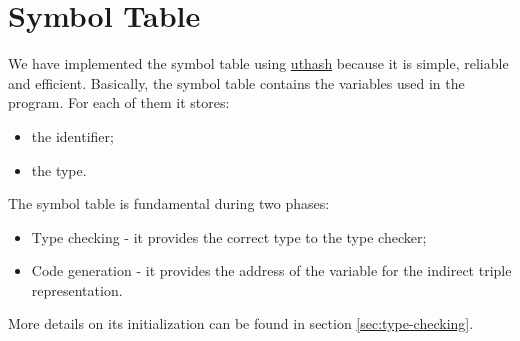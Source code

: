 \section{Symbol Table}
We have implemented the symbol table using
\href{https://troydhanson.github.io/uthash/}{uthash} because it is simple, reliable and efficient. Basically, the symbol table contains the variables used in the program. For each of them it stores:
\begin{itemize}
	\item the identifier;
	\item the type.
\end{itemize}

The symbol table is fundamental during two phases:
\begin{itemize}
	\item Type checking - it provides the correct type to the type checker;
	\item Code generation - it provides the address of the variable for the
	indirect triple representation.
\end{itemize}
More details on its initialization can be found in section \ref{sec:type-checking}.
